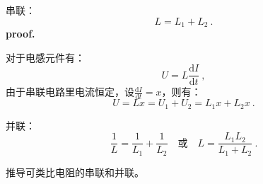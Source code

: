 
\begin{issues}
\issueDraft
\end{issues}


串联：
\begin{equation}
L = L_1 + L_2~.
\end{equation}
\textbf{proof.}

对于电感元件有：
\begin{equation}
U=L\frac{\mathrm d I}{\mathrm d t}~,
\end{equation}
由于串联电路里电流恒定，设$\frac{\mathrm d I}{\mathrm d t}=x$，则有：
\begin{equation}
U=Lx=U_1+U_2=L_1x+L_2x~.
\end{equation}


并联：
\begin{equation}
\frac{1}{L} = \frac{1}{L_1} + \frac{1}{L_2}
\quad \text{或} \quad
L = \frac{L_1L_2}{L_1 + L_2}~.
\end{equation}


推导可类比电阻的串联和并联。
